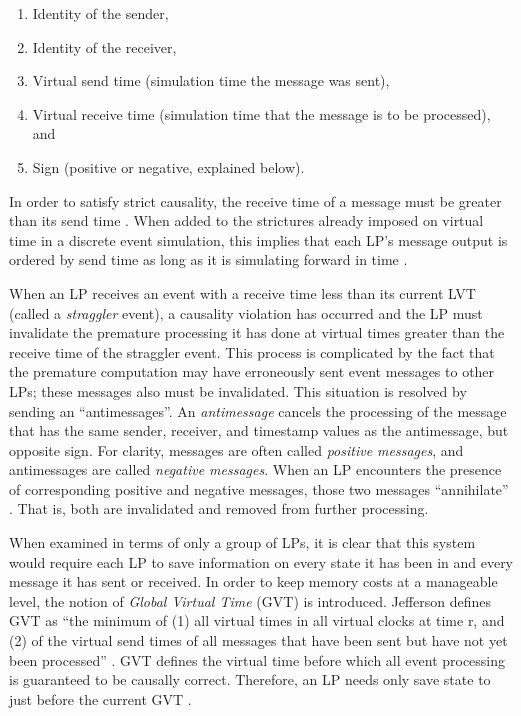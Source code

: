 \documentclass[11pt]{book}
\begin{document}
\begin{enumerate}
  \item Identity of the sender,
  \item Identity of the receiver,
  \item Virtual send time (simulation time the message was sent),
  \item Virtual receive time (simulation time that the message is to be processed), and
  \item Sign (positive or negative, explained below).
\end{enumerate}

In order to satisfy strict causality, the receive time of a message must be
greater than its send time \cite{lamport-78}.  When added to the strictures
already imposed on virtual time in a discrete event simulation, this implies
that each LP's message output is ordered by send time as long as it is
simulating forward in time \cite{jefferson-85}.

When an LP receives an event with a receive time less than its current LVT (called a
\emph{straggler} event), a causality violation has occurred and the LP must invalidate the
premature processing it has done at virtual times greater than the receive time of the
straggler event.  This process is complicated by the fact that the premature computation
may have erroneously sent event messages to other LPs; these messages also must be
invalidated.  This situation is resolved by sending an ``antimessages''.  An
\textit{antimessage} cancels the processing of the message that has the same sender,
receiver, and timestamp values as the antimessage, but opposite sign.  For clarity,
messages are often called \textit{positive messages}, and antimessages are called
\textit{negative messages}.  When an LP encounters the presence of corresponding positive
and negative messages, those two messages ``annihilate'' \cite{jefferson-85}.  That is,
both are invalidated and removed from further processing.

When examined in terms of only a group of LPs, it is clear that this system would require
each LP to save information on every state it has been in and every message it has sent or
received.  In order to keep memory costs at a manageable level, the notion of
\textit{Global Virtual Time} (GVT) is introduced.  Jefferson defines GVT as ``the minimum
of (1) all virtual times in all virtual clocks at time r, and (2) of the virtual send
times of all messages that have been sent but have not yet been processed''
\cite{jefferson-85}.  GVT defines the virtual time before which all event processing is
guaranteed to be causally correct.  Therefore, an LP needs only save state to just before
the current GVT \cite{fujimoto-89b}.
\end{document}
